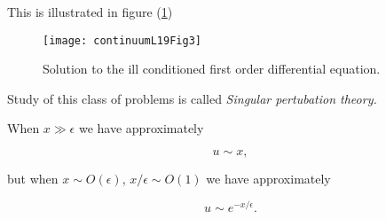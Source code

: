 This is illustrated in figure (\ref{fig:continuumL19:continuumL19Fig3})
\begin{figure}[htp]
   \centering
   \texttt{[image: continuumL19Fig3]}
   \caption{Solution to the ill conditioned first order differential equation.}\label{fig:continuumL19:continuumL19Fig3}
\end{figure}

Study of this class of problems is called \em{Singular pertubation theory}.

When $x \gg \epsilon$ we have approximately

\begin{equation}\label{eqn:continuumL19:n}
u \sim x,
\end{equation}

but when $x \sim O(\epsilon)$, $x/\epsilon \sim O(1)$ we have approximately

\begin{equation}\label{eqn:continuumL19:n}
u \sim e^{-x/\epsilon}.
\end{equation}

\EndNoBibArticle
